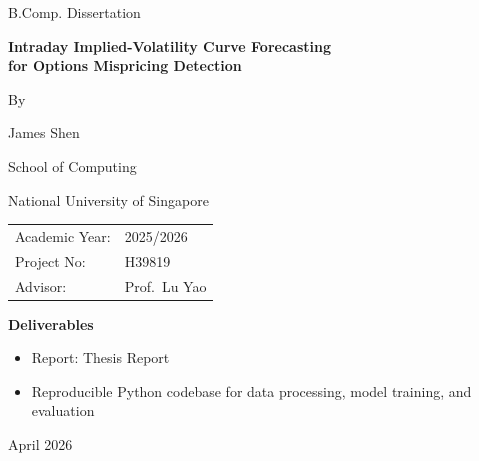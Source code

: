 \documentclass[12pt]{report}
\begin{document}
\begin{titlepage}
\thispagestyle{empty}
\centering

\vspace*{1.5cm}

{\Large B.Comp. Dissertation\par}
\vspace{1.2cm}

{\Huge\bfseries Intraday Implied-Volatility Curve Forecasting\\[0.25em]
for Options Mispricing Detection\\[0.25em]\par}

\vspace{1.4cm}

{\Large By\par}
\vspace{0.4cm}
{\Large James Shen\par}

\vspace{0.6cm}
{\large School of Computing\par}
{\large National University of Singapore\par}

\vspace{1.0cm}

\begin{tabular}{@{}ll@{}}
Academic Year: & 2025/2026 \\
Project No:    & H39819 \\
Advisor:       & Prof.\ Lu Yao \\
\end{tabular}

\vspace{1.2cm}

\begin{minipage}{0.78\textwidth}
\textbf{Deliverables}
\begin{itemize}[leftmargin=1.4cm,itemsep=0.2em,topsep=0.2em]
    \item Report: Thesis Report
    \item Reproducible Python codebase for data processing, model training, and evaluation

\end{itemize}
\end{minipage}

\vfill

{\large April 2026\par}

\end{titlepage}
\end{document}
